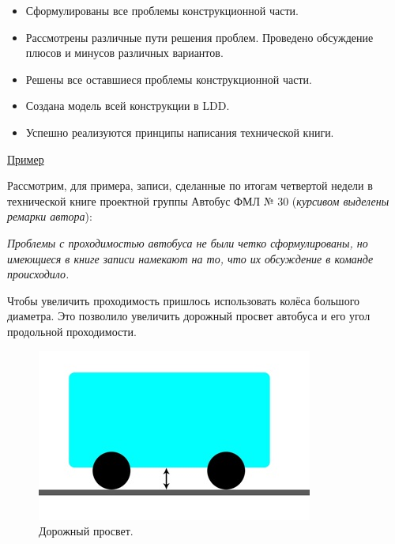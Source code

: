 \begin{itemize}
	\item Сформулированы  все проблемы конструкционной части.
	\item Рассмотрены различные пути решения проблем. Проведено обсуждение плюсов и минусов различных вариантов.
	\item Решены  все  оставшиеся проблемы конструкционной части.
	\item Создана модель всей конструкции в LDD.
	\item Успешно реализуются принципы написания технической книги.
\end{itemize}

\noindent\underline{Пример}

Рассмотрим, для примера, записи, сделанные по итогам четвертой недели в технической книге проектной группы Автобус ФМЛ № 30 ({\slshape курсивом выделены ремарки автора}):

{\slshape Проблемы с проходимостью автобуса не были четко сформулированы, но имеющиеся в книге записи намекают на то, что их обсуждение в команде происходило.}

Чтобы увеличить проходимость пришлось использовать колёса большого диаметра. Это позволило увеличить дорожный просвет автобуса и его угол продольной проходимости.

\begin{figure}[h!]
	\begin{center}
		\includegraphics[width=0.92\linewidth]{chapters/chapter27/images/1}
		\caption{Дорожный просвет.}
		\label{ris:image27x1}
	\end{center}
\end{figure}

